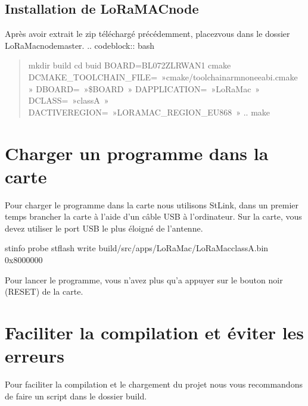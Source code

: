 \documentclass[letterpaper,10pt,french]{sphinxmanual}
\begin{document}
\subsection{Installation de LoRaMAC\sphinxhyphen{}node}
\label{\detokenize{UtilisationLoRa-Node:installation-de-loramac-node}}
Après avoir extrait le zip téléchargé précédemment, placez\sphinxhyphen{}vous dans le dossier LoRaMac\sphinxhyphen{}node\sphinxhyphen{}master.
.. code\sphinxhyphen{}block:: bash
\begin{quote}

mkdir build
cd buid
BOARD=B\sphinxhyphen{}L072Z\sphinxhyphen{}LRWAN1
cmake \sphinxhyphen{}DCMAKE\_TOOLCHAIN\_FILE= »cmake/toolchain\sphinxhyphen{}arm\sphinxhyphen{}none\sphinxhyphen{}eabi.cmake » \sphinxhyphen{}DBOARD= »\$BOARD » \sphinxhyphen{}DAPPLICATION= »LoRaMac » \sphinxhyphen{}DCLASS= »classA » \sphinxhyphen{}DACTIVEREGION= »LORAMAC\_REGION\_EU868 » ..
make
\end{quote}


\section{Charger un programme dans la carte}
\label{\detokenize{UtilisationLoRa-Node:charger-un-programme-dans-la-carte}}
Pour charger le programme dans la carte nous utilisons St\sphinxhyphen{}Link, dans un premier temps brancher la carte à l’aide d’un câble USB à l’ordinateur.
Sur la carte, vous devez utiliser le port USB le plus éloigné de l’antenne.

\begin{sphinxVerbatim}[commandchars=\\\{\}]
st\PYGZhy{}info \PYGZhy{}\PYGZhy{}probe 
st\PYGZhy{}flash write build/src/apps/LoRaMac/LoRaMac\PYGZhy{}classA.bin 0x8000000
\end{sphinxVerbatim}

Pour lancer le programme, vous n’avez plus qu’a appuyer sur le bouton noir (RESET) de la carte.


\section{Faciliter la compilation et éviter les erreurs}
\label{\detokenize{UtilisationLoRa-Node:faciliter-la-compilation-et-eviter-les-erreurs}}
Pour faciliter la compilation et le chargement du projet nous vous recommandons de faire un script dans le dossier build.
\end{document}
